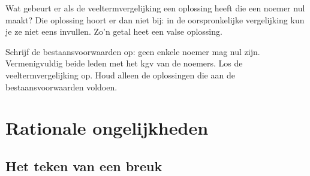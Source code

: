 Wat gebeurt er als de veeltermvergelijking een oplossing heeft die een noemer nul maakt? Die oplossing hoort er dan niet bij: in de oorspronkelijke vergelijking kun je ze niet eens invullen. Zo'n getal heet een valse oplossing.


\begin{oefeningen}
\end{oefeningen}

\begin{werkwijze}
Schrijf de bestaansvoorwaarden op: geen enkele noemer mag nul zijn. Vermenigvuldig beide leden met het kgv van de noemers. Los de veeltermvergelijking op. Houd alleen de oplossingen die aan de bestaansvoorwaarden voldoen.
\end{werkwijze}

\begin{oefeningen}
\end{oefeningen}

\section{Rationale ongelijkheden}

\subsection{Het teken van een breuk}

